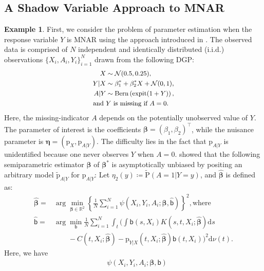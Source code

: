 \documentclass{article}
\def\calN{\mathcal{N}}
\def\sfb{\mathsf{b}}
\def\sfb{\mathsf{b}}
\def\expit{\mathrm{expit}}
\theoremstyle{plain}
\theoremstyle{definition}
\newtheorem{example}[theorem]{Example}
\theoremstyle{remark}
\def\diff{\mathrm{d}}
\def\P{\mathrm{P}}
\def\bbeta{\boldsymbol{\beta}}
\def\hat{\widehat}
\def\tilde{\widetilde}
\def\p{\mathrm{p}}
\def\bbR{\mathbb{R}}
\begin{document}
\subsection{A Shadow Variable Approach to MNAR}
\begin{example}
\label{mnar_data}
First, we consider the problem of parameter estimation when the response variable $Y$ is MNAR using the approach introduced in \citet{zhao2022versatile}. The observed data is comprised of $N$ independent and identically distributed (i.i.d.) observations $\{X_{i}, A_{i}, Y_{i}\}_{i = 1}^{N}$ drawn from the following DGP:
\begin{equation}
\small
\label{model-mnar}
\begin{split}
X & \sim \calN (0.5, 0.25), \\
Y | X & \sim \beta_1^\ast + \beta_2^\ast X + \calN (0, 1), \\
A | Y & \sim \text{Bern} \left( \expit (1 + Y) \right), \\
\text{and } & \text{$Y$ is missing if $A = 0$}.
\end{split}
\end{equation}
Here, the missing-indicator $A$ depends on the potentially unobserved value of $Y$. The parameter of interest is the coefficients $\bbeta = (\beta_{1}, \beta_{2})^{\top}$, while the nuisance parameter is $\bm\eta = (\p_{X}, \p_{A | Y})$. The difficulty lies in the fact that $\p_{A | Y}$ is unidentified because one never observes $Y$ when $A = 0$. \citet{zhao2022versatile} showed that the following semiparametric estimator $\hat{\bbeta}$ of $\bbeta^{\ast}$ is asymptotically unbiased by positing an arbitrary model $\tilde{\p}_{A | Y}$ for $\p_{A | Y}$:  Let $\eta_{2} (y) \coloneqq \tilde{\P} (A = 1 | Y = y)$, and $\hat{\bbeta}$ is defined as:
{\small\begin{align}
\hat{\bbeta} = & \arg\min_{\bbeta \in \bbR^{2}} \left\{ \frac{1}{N} \sum_{i = 1}^{N} \psi (X_{i}, Y_{i}, A_{i}; \bbeta, \hat{\sfb}) \right\}^2, \text{where} \nonumber \\
\hat{\sfb} = & \arg\min_{\sfb} \frac{1}{N} \sum_{i=1}^N \int_{t} \Bigg( \int \sfb (s,X_i) K (s,t,X_i; \hat{\bbeta}) \diff s \nonumber \\
& \quad \quad -C (t, X_i; \hat{\bbeta}) - \p_{Y | X} (t,X_i; \hat{\bbeta}) \sfb (t,X_i) \Bigg)^2 \diff \nu (t). \label{mnar_eq1}
\end{align}}
Here, we have
\begin{align*}
& \ \psi (X_{i}, Y_{i}, A_{i}; \bbeta, \sfb) \\

\end{align*}
\end{example}
\end{document}
